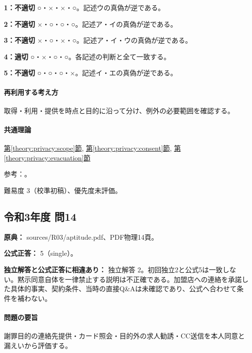 \noindent\textbf{1：不適切} ○・×・×・○。記述ウの真偽が逆である。\par

\noindent\textbf{2：不適切} ×・○・○・○。記述ア・イの真偽が逆である。\par

\noindent\textbf{3：不適切} ×・○・×・○。記述ア・イ・ウの真偽が逆である。\par

\noindent\textbf{4：適切} ○・×・○・○。各記述の判断と全て一致する。\par

\noindent\textbf{5：不適切} ○・○・○・×。記述イ・エの真偽が逆である。\par

\paragraph{再利用する考え方} 取得・利用・提供を時点と目的に沿って分け、例外の必要範囲を確認する。

\paragraph{共通理論} \hyperref[theory:privacy:scope]{第\ref*{theory:privacy:scope}節}, \hyperref[theory:privacy:consent]{第\ref*{theory:privacy:consent}節}, \hyperref[theory:privacy:evacuation]{第\ref*{theory:privacy:evacuation}節}

\par 参考：\cite{privacy_general,privacy_evacuation2013,privacy_evacuation_scope}。

\par 難易度 3（校準初稿）、優先度未評価。

\subsection{令和3年度 問14}
\label{q:r03-reg-apt-14}

\noindent\textbf{原典：} sources/R03/aptitude.pdf、PDF物理14頁。

\textbf{公式正答：} 5（single）。

\par\textbf{独立解答と公式正答に相違あり：} 独立解答 2。初回独立2と公式5は一致しない。黙示同意自体を一律禁止する説明は不正確である。加盟店への連絡を承諾した具体的事実、契約条件、当時の直接Q\&Aは未確認であり、公式へ合わせて条件を補わない。

\paragraph{問題の要旨} 謝罪目的の連絡先提供・カード照会・目的外の求人勧誘・CC送信を本人同意と漏えいから評価する。

